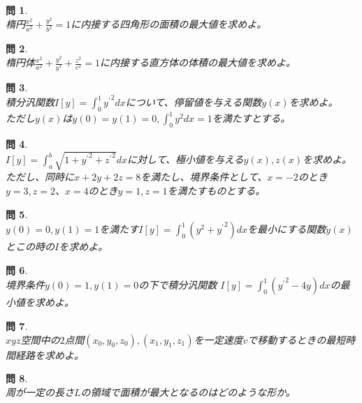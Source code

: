 \documentclass{jsarticle}
\newtheorem{pro}{問}[section]
\begin{document}
\begin{pro}~\\
楕円\(\displaystyle\frac{x^{2}}{a^{2}}+\frac{y^{2}}{b^{2}}=1\)に内接する四角形の面積の最大値を求めよ。
\end{pro}

\begin{pro}~\\
楕円体\(\displaystyle\frac{x^{2}}{a^{2}}+\frac{y^{2}}{b^{2}}+\frac{z^{2}}{c^{2}}=1\)に内接する直方体の体積の最大値を求めよ。
\end{pro}

\begin{pro}~\\
積分汎関数\(\displaystyle I[y]=\int_{0}^{1}{y^{\prime}}^{2}dx\)について、停留値を与える関数\(y(x)\)を求めよ。\\
ただし\(y(x)\)は\(\displaystyle y(0)=y(1)=0,\int_{0}^{1}y^{2}dx=1\)を満たすとする。
\end{pro}

\begin{pro}~\\
\(\displaystyle I[y]=\int_{a}^{b}\sqrt{1+{y^{\prime}}^{2}+{z^{\prime}}^{2}}dx\)に対して、極小値を与える\(y(x),z(x)\)を求めよ。ただし、同時に\(x+2y+2z=8\)を満たし、境界条件として、\(x=-2\)のとき\(y=3,z=2\)、\(x=4\)のとき\(y=1,z=1\)を満たすものとする。
\end{pro}

\begin{pro}~\\
\(y(0)=0,y(1)=1\)を満たす\(\displaystyle I[y]=\int_{0}^{1}(y^{2}+{y^{\prime}}^{2})dx\)を最小にする関数\(y(x)\)とこの時の\(I\)を求めよ。
\end{pro}

\begin{pro}~\\
境界条件\(y(0)=1,y(1)=0\)の下で積分汎関数
\(\displaystyle I[y]=\int_{0}^{1}({y^{\prime}}^{2}-4y)dx\)の最小値を求めよ。
\end{pro}

\begin{pro}~\\
\(xyz\)空間中の\(2\)点間\((x_{0},y_{0},z_{0}),(x_{1},y_{1},z_{1})\)を一定速度\(v\)で移動するときの最短時間経路を求めよ。
\end{pro}

\begin{pro}~\\
周が一定の長さ\(L\)の領域で面積が最大となるのはどのような形か。
\end{pro}
\end{document}

